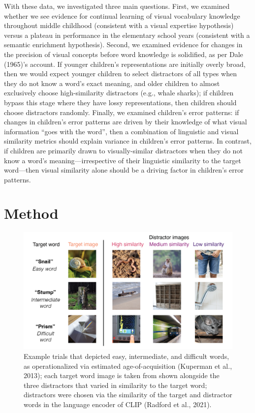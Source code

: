 \documentclass[
  man,mask]{apa6}
\begin{document}
With these data, we investigated three main questions. First, we examined whether we see evidence for continual learning of visual vocabulary knowledge throughout middle childhood (consistent with a visual expertise hypothesis) versus a plateau in performance in the elementary school years (consistent with a semantic enrichment hypothesis). Second, we examined evidence for changes in the precision of visual concepts before word knowledge is solidified, as per Dale (1965)'s account. If younger children's representations are initially overly broad, then we would expect younger children to select distractors of all types when they do not know a word's exact meaning, and older children to almost exclusively choose high-similarity distractors (e.g., whale sharks); if children bypass this stage where they have lossy representations, then children should choose distractors randomly. Finally, we examined children's error patterns: if changes in children's error patterns are driven by their knowledge of what visual information ``goes with the word'', then a combination of linguistic and visual similarity metrics should explain variance in children's error patterns. In contrast, if children are primarily drawn to visually-similar distractors when they do not know a word's meaning---irrespective of their linguistic similarity to the target word---then visual similarity alone should be a driving factor in children's error patterns.

\section{Method}\label{method}

\begin{figure}[H]

{\centering \includegraphics[width=1\linewidth]{figures/fig1_stimuli} 

}

\caption{Example trials that depicted easy, intermediate, and difficult words, as operationalized via estimated age-of-acquisition (Kuperman et al., 2013); each target word image is taken from shown alongside the three distractors that varied in similarity to the target word; distractors were chosen via the similarity of the target and distractor words in the language encoder of CLIP (Radford et al., 2021). }\label{fig:procedure-figure}
\end{figure}
\end{document}
